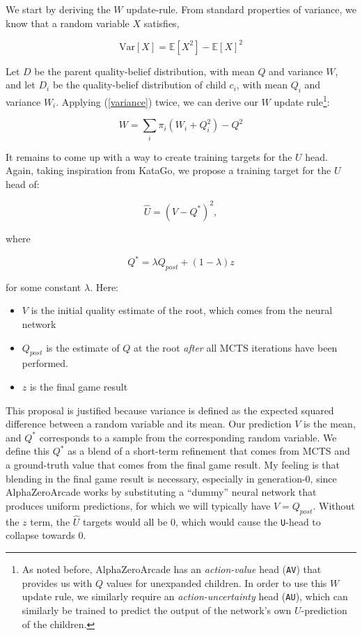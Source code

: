 \documentclass[tikz]{article}
\newcommand{\Var}{\mathrm{Var}}
\begin{document}
We start by deriving the $W$ update-rule. From standard properties of variance, we know that a random variable $X$ satisfies,

\begin{equation}
\label{variance}    
\Var[X] = \mathbb{E}[X^2] - \mathbb{E}[X]^2
\end{equation}

Let $D$ be the parent quality-belief distribution, with mean $Q$ and variance $W$, and let $D_i$ be the quality-belief distribution of
child $c_i$, with mean $Q_i$ and variance $W_i$. Applying (\ref{variance}) twice, we can derive our $W$ update rule\footnote{
As noted before, AlphaZeroArcade has an \emph{action-value} head (\texttt{AV}) that provides us with $Q$ values for unexpanded children.
In order to use this $W$ update rule, we similarly require an \emph{action-uncertainty} head (\texttt{AU}), which can similarly be
trained to predict the output of the network's own $U$-prediction of the children.}:

\begin{equation}
\label{W-update}    
W = \sum_{i} \pi_i (W_i + Q_i^2) - Q^2
\end{equation}

It remains to come up with a way to create training targets for the $U$ head. Again, taking inspiration from KataGo, we propose
a training target for the $U$ head of:

$$\hat{U} = (V - Q^*)^2,$$

where

$$Q^* = \lambda Q_{post} + (1-\lambda)z$$

for some constant $\lambda$. Here:

\begin{itemize}
    \item $V$ is the initial quality estimate of the root, which comes from the neural network
    \item $Q_{post}$ is the estimate of $Q$ at the root \emph{after} all MCTS iterations have been performed.
    \item $z$ is the final game result
\end{itemize}
This proposal is justified because variance is defined as the expected squared difference between a random variable and its mean.
Our prediction $V$ is the mean, and $Q^*$ corresponds to a sample from the corresponding random variable. We define this $Q^*$
as a blend of a short-term refinement that comes from MCTS and a ground-truth value that comes from the final game result.
My feeling is that blending in the final game result is necessary, especially in generation-0, since AlphaZeroArcade works by
substituting a ``dummy'' neural network that produces uniform predictions, for which we will typically have $V = Q_{post}$.
Without the $z$ term, the $\hat{U}$ targets would all be 0, which would cause the \texttt{U}-head to collapse towards 0. \newline
\end{document}
